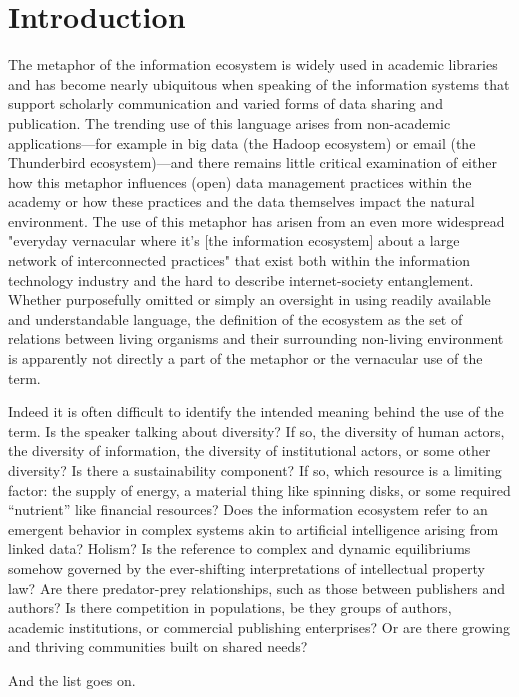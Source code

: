 \section{Introduction}

The metaphor of the information ecosystem is widely used in academic libraries and has become nearly ubiquitous when speaking of the information systems that support scholarly communication and varied forms of data sharing and publication. The trending use of this language arises from non-academic applications—for example in big data (the Hadoop ecosystem) or email (the Thunderbird ecosystem)—and there remains little critical examination of either how this metaphor influences (open) data management practices within the academy or how these practices and the data themselves impact the natural environment. The use of this metaphor has arisen from an even more widespread "everyday vernacular where it’s [the information ecosystem] about a large network of interconnected practices" that exist both within the information technology industry and the hard to describe internet-society entanglement. Whether purposefully omitted or simply an oversight in using readily available and understandable language, the definition of the ecosystem as the set of relations between living organisms and their surrounding non-living environment is apparently not directly a part of the metaphor or the vernacular use of the term.

Indeed it is often difficult to identify the intended meaning behind the use of the term. Is the speaker talking about diversity? If so, the diversity of human actors, the diversity of information, the diversity of institutional actors, or some other diversity? Is there a sustainability component? If so, which resource is a limiting factor: the supply of energy, a material thing like spinning disks, or some required “nutrient” like financial resources? Does the information ecosystem refer to an emergent behavior in complex systems akin to artificial intelligence arising from linked data? Holism? Is the reference to complex and dynamic equilibriums somehow governed by the ever-shifting interpretations of intellectual property law? Are there predator-prey relationships, such as those between publishers and authors? Is there competition in populations, be they groups of authors, academic institutions, or commercial publishing enterprises? Or are there growing and thriving communities built on shared needs? 

And the list goes on. 

